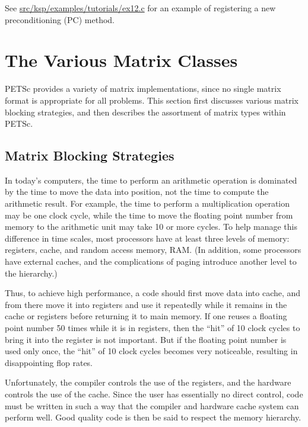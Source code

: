 \documentclass[twoside,12pt]{../sty/report_petsc}
\newcommand{\sindex}[1]{\index{#1}}
\begin{document}
See \href{http://www.mcs.anl.gov/petsc/petsc-dev/src/ksp/ksp/examples/tutorials/ex12.c.html}{src/ksp/examples/tutorials/ex12.c} for an example of registering a new
preconditioning (PC) method.



\chapter{The Various Matrix Classes}
\label{sec:matclasses}

PETSc provides a variety of matrix implementations, since no single
matrix format is appropriate for all problems.  This section first
discusses various matrix blocking strategies, and then
describes the assortment of matrix types within PETSc.

\section{Matrix Blocking Strategies}
\sindex{matrix blocking}
\sindex{blocking}

In today's computers, the time to perform an arithmetic operation is
dominated by the time to move the data into position, not the time to
compute the arithmetic result.  For example, the time to perform a
multiplication operation may be one clock cycle, while the time to
move the floating point number from memory to the arithmetic unit may
take 10 or more cycles. To help manage this difference in time scales,
most processors have at least three levels of memory: registers,
cache, and random access memory, RAM. (In addition, some processors
have external caches, and the complications of paging introduce
another level to the hierarchy.)

Thus, to achieve high performance, a code should first move data into
cache, and from there move it into registers and use it repeatedly
while it remains in the cache or registers before returning it to main
memory. If one reuses a floating point number 50 times while it is in
registers, then the ``hit'' of 10 clock cycles to bring it into the
register is not important. But if the floating point number is used
only once, the ``hit'' of 10 clock cycles becomes very noticeable,
resulting in disappointing flop rates.

Unfortunately, the compiler controls the use of the registers, and the
hardware controls the use of the cache. Since the user has essentially
no direct control, code must be written in such a way that the
compiler and hardware cache system can perform well. Good quality code
is then be said to respect the memory hierarchy.
\end{document}
